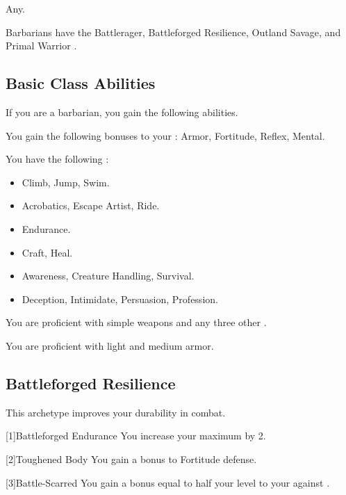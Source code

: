      Any.

     Barbarians have the Battlerager, Battleforged Resilience, Outland Savage, and Primal Warrior .

    \subsection{Basic Class Abilities}
        If you are a barbarian, you gain the following abilities.

        You gain the following bonuses to your :  Armor,  Fortitude,  Reflex,  Mental.

        You have the following :
        \begin{itemize}
            \item {} Climb, Jump, Swim.
            \item {} Acrobatics, Escape Artist, Ride.
            \item {} Endurance.
            \item {} Craft, Heal.
            \item {} Awareness, Creature Handling, Survival.
            \item {} Deception, Intimidate, Persuasion, Profession.
        \end{itemize}

        You are proficient with simple weapons and any three other .

        You are proficient with light and medium armor.

    \subsection{Battleforged Resilience}
        This archetype improves your durability in combat.

        [1]{Battleforged Endurance} You increase your maximum  by 2.

        [2]{Toughened Body} You gain a  bonus to Fortitude defense.

        [3]{Battle-Scarred} You gain a bonus equal to half your level to your  against .

